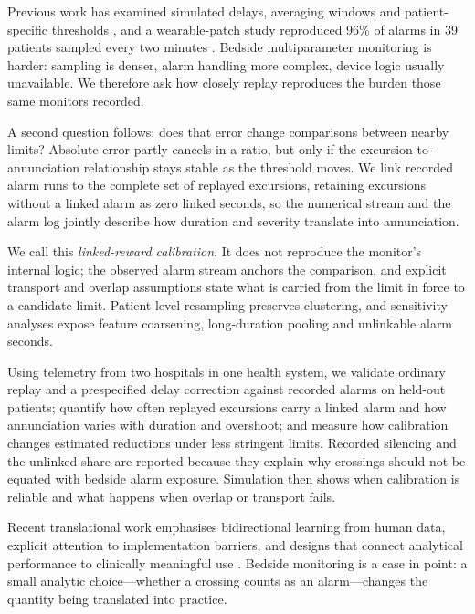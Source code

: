 \documentclass[11pt,letterpaper]{article}
\begin{document}
Previous work has examined simulated delays, averaging windows and patient-specific thresholds \citep{chromik2022computational,chiziwa2026thresholds}, and a wearable-patch study reproduced 96\% of alarms in 39 patients sampled every two minutes \citep{vanrossum2022adaptive}. Bedside multiparameter monitoring is harder: sampling is denser, alarm handling more complex, device logic usually unavailable. We therefore ask how closely replay reproduces the burden those same monitors recorded.

A second question follows: does that error change comparisons between nearby limits? Absolute error partly cancels in a ratio, but only if the excursion-to-annunciation relationship stays stable as the threshold moves. We link recorded alarm runs to the complete set of replayed excursions, retaining excursions without a linked alarm as zero linked seconds, so the numerical stream and the alarm log jointly describe how duration and severity translate into annunciation.

We call this \emph{linked-reward calibration}. It does not reproduce the monitor's internal logic; the observed alarm stream anchors the comparison, and explicit transport and overlap assumptions state what is carried from the limit in force to a candidate limit. Patient-level resampling preserves clustering, and sensitivity analyses expose feature coarsening, long-duration pooling and unlinkable alarm seconds.

Using telemetry from two hospitals in one health system, we validate ordinary replay and a prespecified delay correction against recorded alarms on held-out patients; quantify how often replayed excursions carry a linked alarm and how annunciation varies with duration and overshoot; and measure how calibration changes estimated reductions under less stringent limits. Recorded silencing and the unlinked share are reported because they explain why crossings should not be equated with bedside alarm exposure. Simulation then shows when calibration is reliable and what happens when overlap or transport fails.

Recent translational work emphasises bidirectional learning from human data, explicit attention to implementation barriers, and designs that connect analytical performance to clinically meaningful use \citep{liang2026paradigm,clay2026firstprinciples,gin2026immunoassay}. Bedside monitoring is a case in point: a small analytic choice---whether a crossing counts as an alarm---changes the quantity being translated into practice.
\end{document}
